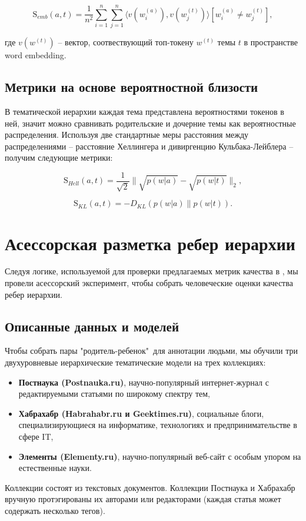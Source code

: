 $$\mathrm{S}_{emb}(a, t) = \dfrac{1}{n^2}\sum\limits_{i=1}^n \sum\limits_{j=1}^n \langle v(w^{(a)}_i), v(w^{(t)}_j)\rangle[w_i^{(a)} \neq w_j^{(t)}],$$ 

где $v(w^{(t)})$ -- вектор, соотвествующий топ-токену $w^{(t)}$ темы $t$ в пространстве word embedding.

\subsection{Метрики на основе вероятностной близости}
В тематической иерархии каждая тема представлена вероятностями токенов в ней, значит можно сравнивать родительские и дочерние темы как вероятностные распределения. Используя две стандартные меры расстояния между распределениями -- расстояние Хеллингера и дивиргенцию Кульбака-Лейблера -- получим следующие метрики:

$$ \mathrm{S}_{Hell}(a, t) = \dfrac{1}{\sqrt{2}} \| \sqrt{p(w|a)} - \sqrt{p(w|t)}\|_2,$$

$$\mathrm{S}_{KL}(a, t) = -D_{KL}(p(w|a)\|p(w|t)).$$

\section{Асессорская разметка ребер иерархии}
Следуя логике, используемой для проверки предлагаемых метрик качества в \cite{Mimno2011, Nikolenko2016}, мы провели асессорский эксперимент, чтобы собрать человеческие оценки качества ребер иерархии.

\subsection{Описанные данных и моделей}
Чтобы собрать пары "родитель-ребенок"\ для аннотации людьми, мы обучили три двухуровневые иерархические тематические модели на трех коллекциях:
\begin{itemize}
\item \textbf{Постнаука (Postnauka.ru)}, научно-популярный интернет-журнал с редактируемыми статьями по широкому спектру тем,
\item \textbf{Хабрахабр (Habrahabr.ru и Geektimes.ru)}, социальные блоги, специализирующиеся на информатике, технологиях и предпринимательстве в сфере IT,
\item \textbf{Элементы (Elementy.ru)}, научно-популярный веб-сайт с особым упором на естественные науки.
\end{itemize}

Коллекции состоят из текстовых документов. Коллекции Постнаука и Хабрахабр вручную протэгированы их авторами или редакторами (каждая статья может содержать несколько тегов).

